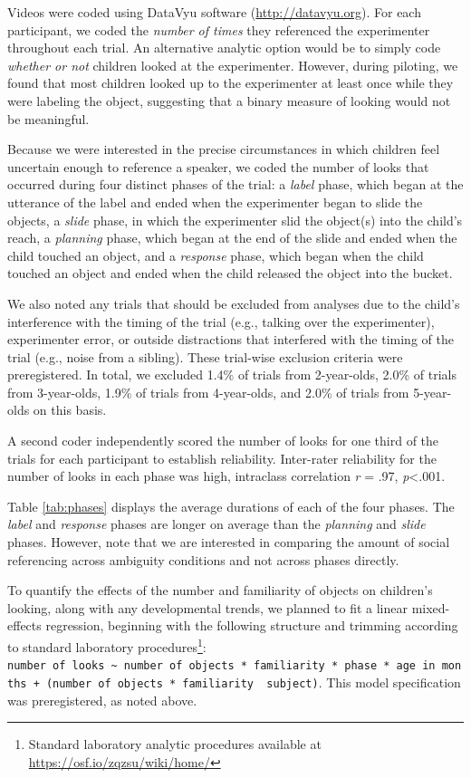 \documentclass[a4paper,man,apacite,floatsintext]{apa6}
\begin{document}
Videos were coded using DataVyu software (\url{http://datavyu.org}). For
each participant, we coded the \emph{number of times} they referenced
the experimenter throughout each trial. An alternative analytic option
would be to simply code \emph{whether or not} children looked at the
experimenter. However, during piloting, we found that most children
looked up to the experimenter at least once while they were labeling the
object, suggesting that a binary measure of looking would not be
meaningful.

Because we were interested in the precise circumstances in which
children feel uncertain enough to reference a speaker, we coded the
number of looks that occurred during four distinct phases of the trial:
a \emph{label} phase, which began at the utterance of the label and
ended when the experimenter began to slide the objects, a \emph{slide}
phase, in which the experimenter slid the object(s) into the child's
reach, a \emph{planning} phase, which began at the end of the slide and
ended when the child touched an object, and a \emph{response} phase,
which began when the child touched an object and ended when the child
released the object into the bucket.

We also noted any trials that should be excluded from analyses due to
the child's interference with the timing of the trial (e.g., talking
over the experimenter), experimenter error, or outside distractions that
interfered with the timing of the trial (e.g., noise from a sibling).
These trial-wise exclusion criteria were preregistered. In total, we
excluded 1.4\% of trials from 2-year-olds, 2.0\% of trials from
3-year-olds, 1.9\% of trials from 4-year-olds, and 2.0\% of trials from
5-year-olds on this basis.

A second coder independently scored the number of looks for one third of
the trials for each participant to establish reliability. Inter-rater
reliability for the number of looks in each phase was high, intraclass
correlation \emph{r} = .97, \emph{p}\textless{}.001.

Table \ref{tab:phases} displays the average durations of each of the
four phases. The \emph{label} and \emph{response} phases are longer on
average than the \emph{planning} and \emph{slide} phases. However, note
that we are interested in comparing the amount of social referencing
across ambiguity conditions and not across phases directly.

To quantify the effects of the number and familiarity of objects on
children's looking, along with any developmental trends, we planned to
fit a linear mixed-effects regression, beginning with the following
structure and trimming according to standard laboratory
procedures\footnote{Standard laboratory analytic procedures available at
  \url{https://osf.io/zqzsu/wiki/home/}}:
\texttt{number\ of\ looks\ \textasciitilde{}\ number\ of\ objects\ *\ familiarity\ *\ phase\ *\ age\ in\ months\ +\ (number\ of\ objects\ *\ familiarity\ \textbar{}\ subject)}.
This model specification was preregistered, as noted above.
\end{document}
